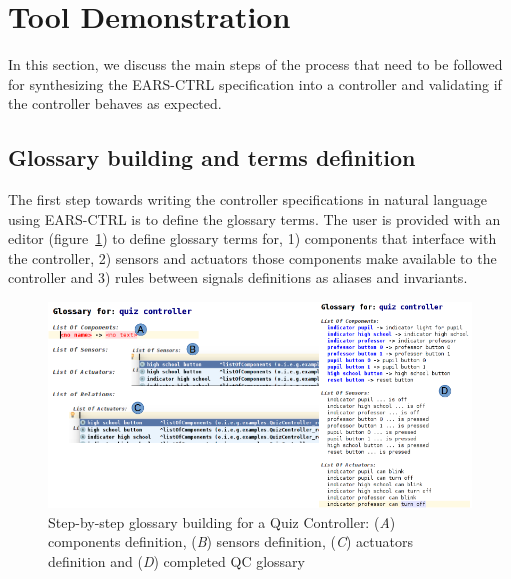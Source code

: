 \vspace{-.5cm}
\section{Tool Demonstration}
\label{sec:demo}
\vspace{-.3cm}
In this section, we discuss the main steps of the process that need to be
followed for synthesizing the EARS-CTRL specification into a controller and
validating if the controller behaves as expected.
\vspace{-.3cm}
\subsection{Glossary building and terms definition}
\vspace{-.2cm}
The first step towards writing the controller specifications in natural
language using \textsf{EARS-CTRL} is to define the glossary terms. 
The user is provided with an editor
(figure~\ref{fig:glossary_def}) to define glossary terms for,
1) components that interface with the controller, 2) sensors and actuators those components make available to the controller and 3) rules between
signals definitions as aliases and invariants.
\vspace{-.2cm}
\begin{figure}[!h]
\centering
\includegraphics[width=1\textwidth]{./images/QC_Glossary_Def.png}
\caption{Step-by-step glossary building for a Quiz Controller: (\emph{A})
components definition, (\emph{B}) sensors definition, (\emph{C}) actuators
definition and (\emph{D}) completed QC glossary}
\label{fig:glossary_def}
\end{figure}
\vspace{-.2cm}
